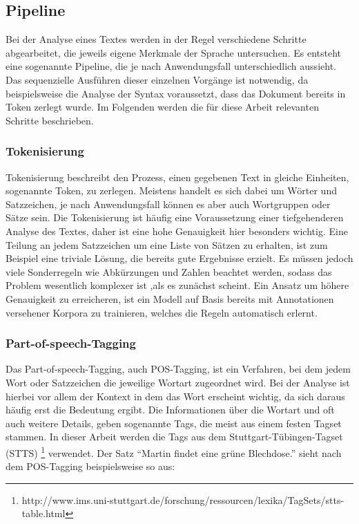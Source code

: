 
\subsection{Pipeline}
Bei der Analyse eines Textes werden in der Regel verschiedene Schritte abgearbeitet, die jeweils eigene Merkmale der Sprache untersuchen. Es entsteht eine sogenannte Pipeline, die je nach Anwendungsfall unterschiedlich aussieht. Das sequenzielle Ausführen dieser einzelnen Vorgänge ist notwendig, da beispielsweise die Analyse der Syntax voraussetzt, dass das Dokument bereits in Token zerlegt wurde. Im Folgenden werden die für diese Arbeit relevanten Schritte beschrieben.


\subsubsection*{Tokenisierung}
Tokenisierung beschreibt den Prozess, einen gegebenen Text in gleiche Einheiten, sogenannte Token, zu zerlegen. Meistens handelt es sich dabei um Wörter und Satzzeichen, je nach Anwendungsfall können es aber auch Wortgruppen oder Sätze sein. Die Tokenisierung ist häufig eine Voraussetzung einer tiefgehenderen Analyse des Textes, daher ist eine hohe Genauigkeit hier besonders wichtig. Eine Teilung an jedem Satzzeichen um eine Liste von Sätzen zu erhalten, ist zum Beispiel eine triviale Lösung, die bereits gute Ergebnisse erzielt. Es müssen jedoch viele Sonderregeln wie Abkürzungen und Zahlen beachtet werden, sodass das Problem wesentlich komplexer ist ,als es zunächst scheint. Ein Ansatz um höhere Genauigkeit zu erreicheren, ist ein Modell auf Basis bereits mit Annotationen versehener Korpora zu trainieren, welches die Regeln automatisch erlernt.

\subsubsection*{Part-of-speech-Tagging}
Das Part-of-speech-Tagging, auch POS-Tagging, ist ein Verfahren, bei dem jedem Wort oder Satzzeichen die jeweilige Wortart zugeordnet wird. Bei der Analyse ist hierbei vor allem der Kontext in dem das Wort erscheint wichtig, da sich daraus häufig erst die Bedeutung ergibt. Die Informationen über die Wortart und oft auch weitere Details, geben sogenannte Tags, die meist aus einem festen Tagset stammen. In dieser Arbeit werden die Tags aus dem Stuttgart-Tübingen-Tagset (STTS) \footnote{http://www.ims.uni-stuttgart.de/forschung/ressourcen/lexika/TagSets/stts-table.html} verwendet. Der Satz "`Martin findet eine grüne Blechdose."' sieht nach dem POS-Tagging beispielsweise so aus:

